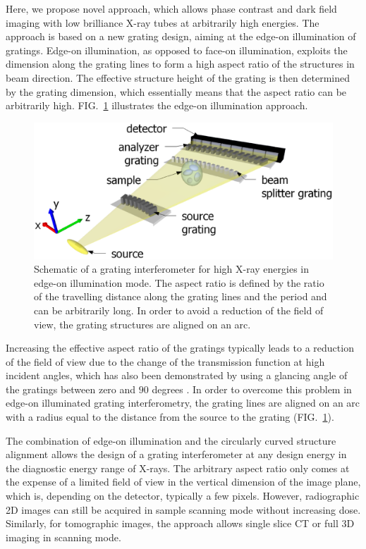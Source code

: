 \documentclass[aip,apl,amsmath,amssymb,floatfix,reprint,a4paper]{revtex4-1}
\begin{document}
Here, we propose novel approach, which allows phase contrast and dark field imaging with low brilliance X-ray tubes at arbitrarily high energies. The approach is based on a new grating design, aiming at the edge-on illumination of gratings. Edge-on illumination, as opposed to face-on illumination, exploits the dimension along the grating lines to form a high aspect ratio of the structures in beam direction. The effective structure height of the grating is then determined by the grating dimension, which essentially means that the aspect ratio can be arbitrarily high. FIG.~\ref{Fig:schematic} illustrates the edge-on illumination approach.
\begin{figure} [ht]
  \includegraphics[width = \linewidth]{figures/figure1.eps}
  \caption{Schematic of a grating interferometer for high X-ray energies in edge-on illumination mode. The aspect ratio is defined by the ratio of the travelling distance along the grating lines and the period and can be arbitrarily long. In order to avoid a reduction of the field of view, the grating structures are aligned on an arc.}
  \label{Fig:schematic}
\end{figure}

Increasing the effective aspect ratio of the gratings typically leads to a reduction of the field of view due to the change of the transmission function at high incident angles, which has also been demonstrated by using a glancing angle of the gratings between zero and $90$ degrees \cite{Stutman2012a}. In order to overcome this problem in edge-on illuminated grating interferometry, the grating lines are aligned on an arc with a radius equal to the distance from the source to the grating (FIG.~\ref{Fig:schematic}).

The combination of edge-on illumination and the circularly curved structure alignment allows the design of a grating interferometer at any design energy in the diagnostic energy range of X-rays. The arbitrary aspect ratio only comes at the expense of a limited field of view in the vertical dimension of the image plane, which is, depending on the detector, typically a few pixels. However, radiographic 2D images can still be acquired in sample scanning mode without increasing dose. Similarly, for tomographic images, the approach allows single slice CT or full 3D imaging in scanning mode.
\end{document}
